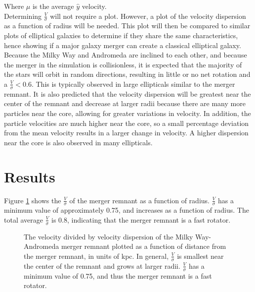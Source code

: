 \documentclass[twocolumn]{aastex63}
\begin{document}
Where $\mu$ is the average $\hat{y}$ velocity.\\

Determining $\frac{V}{\sigma}$ will not require a plot. However, a plot of the velocity dispersion as a function of radius will be needed. This plot will then be compared to similar plots of elliptical galaxies to determine if they share the same characteristics, hence showing if a major galaxy merger can create a classical elliptical galaxy.\\

Because the Milky Way and Andromeda are inclined to each other, and because the merger in the simulation is collisionless, it is expected that the majority of the stars will orbit in random directions, resulting in little or no net rotation and a $\frac{V}{\sigma}<0.6$. This is typically observed in large ellipticals similar to the merger remnant. It is also predicted that the velocity dispersion will be greatest near the center of the remnant and decrease at larger radii because there are many more particles near the core, allowing for greater variations in velocity. In addition, the particle velocities are much higher near the core, so a small percentage deviation from the mean velocity results in a larger change in velocity. A higher dispersion near the core is also observed in many ellipticals.

\section{Results}

Figure \ref{merger_vsigma} shows the $\frac{V}{\sigma}$ of the merger remnant as a function of radius. $\frac{V}{\sigma}$ has a minimum value of approximately 0.75, and increases as a function of radius. The total average $\frac{V}{\sigma}$ is 0.8, indicating that the merger remnant is a fast rotator.\\

\begin{figure}
    \centering
    \caption{The velocity divided by velocity dispersion of the Milky Way-Andromeda merger remnant plotted as a function of distance from the merger remnant, in units of kpc. In general, $\frac{V}{\sigma}$ is smallest near the center of the remnant and grows at larger radii. $\frac{V}{\sigma}$ has a minimum value of 0.75, and thus the merger remnant is a fast rotator.}
    \label{merger_vsigma}
\end{figure}
\end{document}
